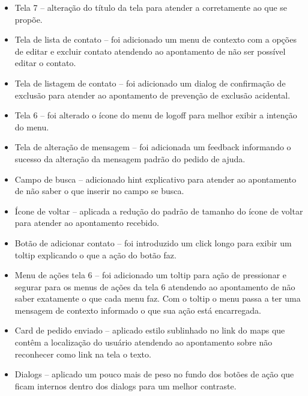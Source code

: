 \begin{itemize}
\item Tela 7 – alteração do título da tela para atender a corretamente ao que se propõe.
\item Tela de lista de contato – foi adicionado um menu de contexto com a opções de editar e excluir contato atendendo ao apontamento de não ser possível editar o contato.
\item Tela de listagem de contato – foi adicionado um dialog de confirmação de exclusão para atender ao apontamento de prevenção de exclusão acidental.
\item Tela 6 – foi alterado o ícone do menu de logoff para melhor exibir a intenção do menu.
\item Tela de alteração de mensagem – foi adicionada um feedback informando o sucesso da alteração da mensagem padrão do pedido de ajuda.
\item Campo de busca – adicionado hint explicativo para atender ao apontamento de não saber o que inserir no campo se busca.
\item Ícone de voltar – aplicada a redução do padrão de tamanho do ícone de voltar para atender ao apontamento recebido.
\item Botão de adicionar contato – foi introduzido um click longo para exibir um toltip explicando o que a ação do botão faz.
\item Menu de ações tela 6 – foi adicionado um toltip para ação de pressionar e segurar para os menus de ações da tela 6 atendendo ao apontamento de não saber exatamente o que cada menu faz. Com o toltip o menu passa a ter uma mensagem de contexto informado o que sua ação está encarregada.
\item Card de pedido enviado – aplicado estilo sublinhado no link do maps que contêm a localização do usuário atendendo ao apontamento sobre não reconhecer como link na tela o texto.
\item Dialogs – aplicado um pouco mais de peso no fundo dos botões de ação que ficam internos dentro dos dialogs para um melhor contraste.

\end{itemize}